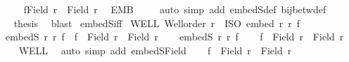 \begin{isabellebody}
\ \ \ \isamarkupfalse%
\ {\isachardoublequoteopen}f{\isacharbackquote}{\kern0pt}{\isacharparenleft}{\kern0pt}Field\ r{\isacharparenright}{\kern0pt}\ {\isasymnoteq}\ Field\ r{\isacharprime}{\kern0pt}{\isachardoublequoteclose}\ \isamarkupfalse%
\ EMB\isanewline
\ \ \ \isamarkupfalse%
\ {\isacharparenleft}{\kern0pt}auto\ simp\ add{\isacharcolon}{\kern0pt}\ embedS{\isacharunderscore}{\kern0pt}def\ bij{\isacharunderscore}{\kern0pt}betw{\isacharunderscore}{\kern0pt}def{\isacharparenright}{\kern0pt}\isanewline
\ \ \isacommand{{\isacharbraceright}{\kern0pt}}\isamarkupfalse%
\isanewline
\ \ \isamarkupfalse%
\ \isamarkupfalse%
\ {\isacharquery}{\kern0pt}thesis\ \isamarkupfalse%
\ blast\isanewline
{}\isamarkupfalse%
%
\endisatagproof
{\isafoldproof}%
%
\isadelimproof
\isanewline
%
\endisadelimproof
\isanewline
{}\isamarkupfalse%
\ embedS{\isacharunderscore}{\kern0pt}iff{\isacharcolon}{\kern0pt}\isanewline
{}\ WELL{\isacharcolon}{\kern0pt}\ {\isachardoublequoteopen}Well{\isacharunderscore}{\kern0pt}order\ r{\isachardoublequoteclose}\ \ ISO{\isacharcolon}{\kern0pt}\ {\isachardoublequoteopen}embed\ r\ r{\isacharprime}{\kern0pt}\ f{\isachardoublequoteclose}\isanewline
{}\ {\isachardoublequoteopen}embedS\ r\ r{\isacharprime}{\kern0pt}\ f\ {\isacharequal}{\kern0pt}\ {\isacharparenleft}{\kern0pt}f\ {\isacharbackquote}{\kern0pt}\ {\isacharparenleft}{\kern0pt}Field\ r{\isacharparenright}{\kern0pt}\ {\isacharless}{\kern0pt}\ Field\ r{\isacharprime}{\kern0pt}{\isacharparenright}{\kern0pt}{\isachardoublequoteclose}\isanewline
%
\isadelimproof
%
\endisadelimproof
%
\isatagproof
{}\isamarkupfalse%
\isanewline
\ \ \isamarkupfalse%
\ {\isachardoublequoteopen}embedS\ r\ r{\isacharprime}{\kern0pt}\ f{\isachardoublequoteclose}\isanewline
\ \ \isamarkupfalse%
\ {\isachardoublequoteopen}f\ {\isacharbackquote}{\kern0pt}\ Field\ r\ {\isasymsubset}\ Field\ r{\isacharprime}{\kern0pt}{\isachardoublequoteclose}\isanewline
\ \ \isamarkupfalse%
\ WELL\ \isamarkupfalse%
\ {\isacharparenleft}{\kern0pt}auto\ simp\ add{\isacharcolon}{\kern0pt}\ embedS{\isacharunderscore}{\kern0pt}Field{\isacharparenright}{\kern0pt}\isanewline
{}\isamarkupfalse%
\isanewline
\ \ \isamarkupfalse%
\ {\isachardoublequoteopen}f\ {\isacharbackquote}{\kern0pt}\ Field\ r\ {\isasymsubset}\ Field\ r{\isacharprime}{\kern0pt}{\isachardoublequoteclose}\isanewline

\end{isabellebody}
